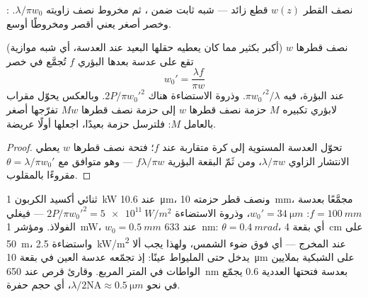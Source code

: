 \begin{omfigure}

{\small {}: نصف القطر $w(z)$ قطع زائد --- شبه
ثابت ضمن ، ثم مخروط نصف زاويته
$\lambda/\pi w_0$. وخصر أصغر يعني  أقصر ومخروطًا
أوسع.}
\end{omfigure}

\begin{proposition}\label{prop:b2:laser:focus}
 نصف قطرها $w$ (أكبر بكثير مما كان يعطيه حقلها
البعيد عند العدسة، أي شبه موازية) تقع على عدسة بعدها
البؤري $f$ تُجمَّع في خصر
\[
w_0' = \frac{\lambda f}{\pi w}
\]
عند البؤرة،  فيه $\pi w_0'^2/\lambda$. وذروة
الاستضاءة هناك $2P/\pi w_0'^2$. وبالعكس يحوّل مقراب لابؤري
تكبيره $M$ حزمة نصف قطرها $w$ إلى حزمة نصف قطرها $Mw$
تفرّجها أصغر بالعامل $M$: فلترسل حزمة بعيدًا، اجعلها
أولًا عريضة.
\end{proposition}

\begin{proof}
تحوّل العدسة  المستوية إلى كرة متقاربة عند $f$؛
 فتحة نصف قطرها $w$ يعطي الانتشار الزاوي
$\lambda/\pi w$، ومن ثَمّ البقعة البؤرية $f\lambda/\pi w$ --- وهو متوافق مع
$\theta = \lambda/\pi w_0'$ مقروءًا بالمقلوب.
\end{proof}

\begin{example}\label{ex:b2:laser:focus}
 ثنائي أكسيد الكربون \qty{1}{kW} عند \qty{10.6}{\micro m}، ونصف قطر حزمته
\qty{10}{mm}، مجمَّعًا بعدسة $f = \qty{100}{mm}$: $w_0' = \qty{34}{\micro m}$،
وذروة الاستضاءة $2P/\pi w_0'^2 = \qty{5e11}{W/m^2}$ --- فيغلي الفولاذ.
ومؤشر \qty{1}{mW}، $w_0 = \qty{0.5}{mm}$ عند \qty{633}{nm}: $\theta =
\qty{0.4}{mrad}$، أي بقعة \qty{4}{cm} على \qty{50}{m}، واستضاءة
\qty{2.5}{kW/m^2} عند المخرج --- أي فوق ضوء الشمس، ولهذا يجب ألا يدخل
حتى المليواط عينًا: إذ تجمّعه عدسة العين في بقعة
\qty{10}{\micro m} على الشبكية بملايين الواطات في المتر
المربع. وقارئ قرص عند \qty{650}{nm} بعدسة فتحتها العددية
$0.6$ يجمّع في نحو $\lambda/2\mathrm{NA} \approx \qty{0.5}{\micro m}$،
أي حجم حفرة.
\end{example}

